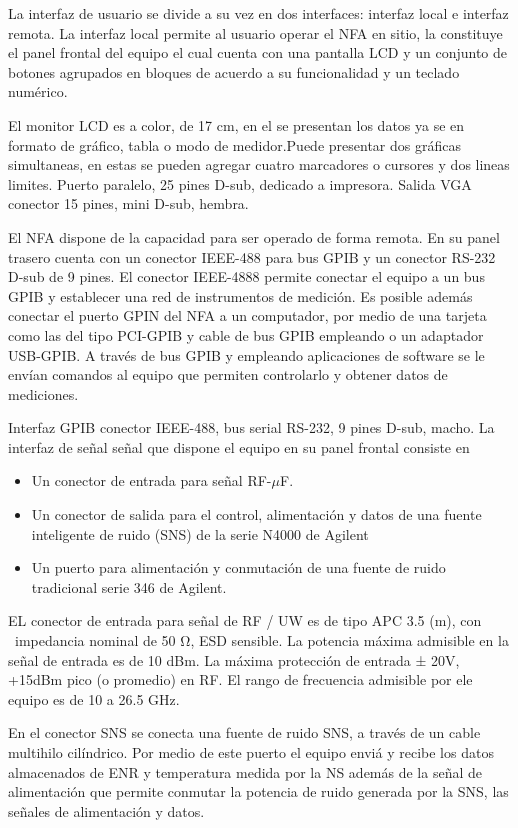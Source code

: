 {La interfaz de usuario se divide a su vez en dos interfaces: interfaz local e interfaz remota. La interfaz local permite al usuario operar el NFA en sitio, la constituye el panel frontal del equipo el cual cuenta con una pantalla LCD y un conjunto de botones agrupados en bloques de acuerdo a su funcionalidad y un teclado numérico.

El monitor LCD es a color, de 17 cm, en el se presentan los datos ya se en formato de gráfico, tabla o modo de medidor.Puede presentar dos gráficas simultaneas, en estas se pueden agregar cuatro marcadores o cursores y dos lineas limites. Puerto paralelo, 25 pines D-sub, dedicado a impresora. Salida VGA conector 15 pines, mini D-sub, hembra.

El NFA dispone de la capacidad para ser operado de forma remota. En su panel trasero cuenta con un conector IEEE-488 para bus GPIB y un conector RS-232 D-sub de 9 pines. El conector IEEE-4888 permite conectar el equipo a un bus GPIB y establecer una red de instrumentos de medición. Es posible además conectar el puerto GPIN del NFA a un computador, por medio de una tarjeta como las del tipo PCI-GPIB y cable de bus GPIB empleando o un adaptador USB-GPIB. A través de bus GPIB y empleando aplicaciones de software se le envían comandos al equipo que permiten controlarlo y obtener datos de mediciones.

Interfaz GPIB conector IEEE-488, bus serial RS-232, 9 pines D-sub, macho.	
La interfaz de señal señal que dispone el equipo en su panel frontal consiste en 

\begin{itemize}
	\item Un conector de entrada para señal RF-$\mu$F. 
	\item Un conector de salida para el control, alimentación y datos de una fuente inteligente de ruido (SNS) de la serie N4000 de Agilent 
	\item Un puerto para alimentación y conmutación de una fuente de ruido tradicional serie 346 de Agilent. 
\end{itemize}
EL conector de entrada para señal de RF / UW es de tipo APC 3.5 (m), con \ impedancia nominal de 50 Ω, ESD sensible. La potencia máxima admisible en la señal de entrada es de 10 dBm. La máxima protección de entrada ± 20V, +15dBm pico (o promedio) en RF. El rango de frecuencia admisible por ele equipo es de 10 a 26.5 GHz.

En el conector SNS se conecta una fuente de ruido SNS, a través de un cable multihilo cilíndrico. Por medio de este puerto el equipo enviá y recibe los datos almacenados de ENR y temperatura medida por la NS además de la señal de alimentación que permite conmutar la potencia de ruido generada por la SNS, las señales de alimentación y datos. 

}
